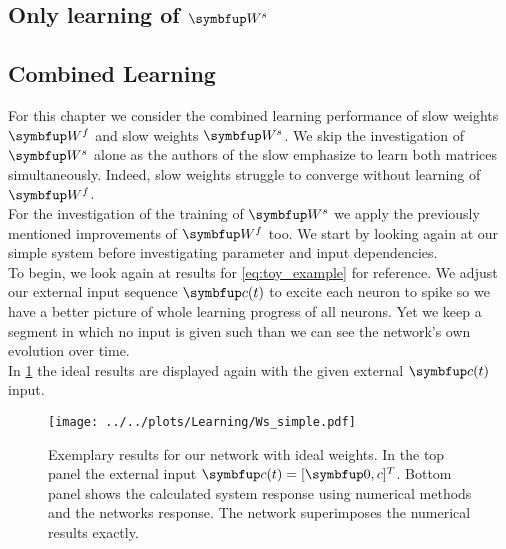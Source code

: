 \subsection{Only learning of $\bmu{W}^s$}
\subsection{Combined Learning}
For this chapter we consider the combined learning performance of slow weights $\bmu{W}^f$ and slow weights $\bmu{W}^s$. We skip the investigation of $\bmu{W}^s$ alone as the authors of the slow emphasize to learn both matrices simultaneously. Indeed, slow weights struggle to converge without learning of $\bmu{W}^f$.\\
For the investigation of the training of $\bmu{W}^s$ we apply the previously mentioned improvements of $\bmu{W}^f$ too. We start by looking again at our simple system before investigating parameter and input dependencies.\\
To begin, we look again at results for \cref{eq:toy_example} for reference. We adjust our external input sequence $\bmu{c}(t)$ to excite each neuron to spike so we have a better picture of whole learning progress of all neurons. Yet we keep a segment in which no input is given such than we can see the network's own evolution over time.\\
In \cref{fig:Ws_intro} the ideal results are displayed again with the given external $\bmu{c}(t)$ input.\\
\begin{figure}
	\centering
	\texttt{[image: ../../plots/Learning/Ws\_simple.pdf]}
	\caption{Exemplary results for our network with ideal weights. In the top panel the external input $\bmu{c}(t) = [\bmu{0},c]^T$. Bottom panel shows the calculated system response using numerical methods and the networks response. The network superimposes the numerical results exactly.}
	\label{fig:Ws_intro}
\end{figure}

